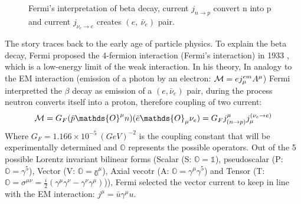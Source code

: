 \begin{figure}[h!]
    \centering
    \caption{Fermi's interpretation of beta decay, current $j_{n \rightarrow p}$ 
    convert n into p and current $j_{\nu_e \rightarrow e}$ creates $(e, \ \bar{\nu}_e) $
    pair.}
\end{figure}
The story traces back to the early age of particle physics. To explain the beta decay, 
Fermi proposed the 4-fermion interaction 
(Fermi's interaction) in 1933 \cite{Fermi1934}, which is a low-energy limit of the 
weak interaction. In his theory, In analogy to the EM interaction (emission of a
photon by an electron: $\mathcal{M} = ej_\mu^{em} A^\mu$) Fermi interpretted the $\beta$
decay as emission of a $(e, \bar{\nu}_e)$ pair, during the process neutron converts
itself into a proton, therefore coupling of two current:
\begin{equation}
    \CM = G_F (\bar{p} \mathds{O}^\mu n)(\bar{e} \mathds{O}_\mu \nu_e) 
	= G_F j^\mu_{(n\rightarrow p)} j_\mu^{(\nu_e\rightarrow e)}
\end{equation}
Where $G_F = 1.166 \times 10^{-5} \ (GeV)^{-2}$ is the coupling constant that 
will be experimentally determined and $\mathds{O}$ represents 
the possible operators. Out of the 5 possible Lorentz invariant bilinear forms 
(Scalar (S: $\mathds{O} = \mathds{1}$), pseudoscalar (P: $\mathds{O} = \gamma^5$), 
Vector (V: $\mathds{O} = \mathds{\gamma^\mu}$), Axial vecotr (A: $\mathds{O} = \gamma^\mu\gamma^5$) 
and Tensor (T: $\mathds{O}=\sigma^{\mu\nu} = \frac{i}{2}(\gamma^\mu\gamma^\nu - \gamma^\nu\gamma^\mu)$)),
Fermi selected the vector current to keep in line with the EM interaction:
$j^\mu = \bar{u} \gamma^\mu u$.

